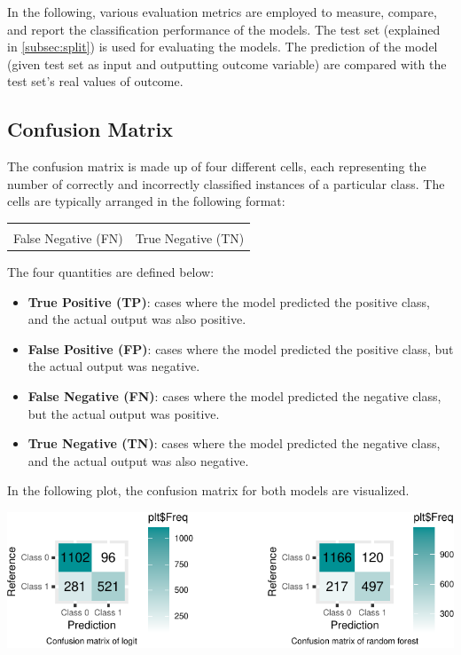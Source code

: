 \documentclass{article}
\providecommand{\tightlist}{%
  \setlength{\itemsep}{0pt}\setlength{\parskip}{0pt}}
\begin{document}
In the following, various evaluation metrics are employed to measure,
compare, and report the classification performance of the models. The
test set (explained in \ref{subsec:split}) is used for evaluating the
models. The prediction of the model (given test set as input and
outputting outcome variable) are compared with the test set's real
values of outcome.

\hypertarget{confusion-matrix}{%
\subsection{Confusion Matrix}\label{confusion-matrix}}

The confusion matrix is made up of four different cells, each
representing the number of correctly and incorrectly classified
instances of a particular class. The cells are typically arranged in the
following format:

\begin{table}[!h]
\centering
\begin{tabular}{ll}
\toprule
\cellcolor{gray!6}{True Positive (TP)} & \cellcolor{gray!6}{False Positive (FP)}\\
False Negative (FN) & True Negative (TN)\\
\bottomrule
\end{tabular}
\end{table}

The four quantities are defined below:

\begin{itemize}
\tightlist
\item
  \textbf{True Positive (TP)}: cases where the model predicted the
  positive class, and the actual output was also positive.
\item
  \textbf{False Positive (FP)}: cases where the model predicted the
  positive class, but the actual output was negative.
\item
  \textbf{False Negative (FN)}: cases where the model predicted the
  negative class, but the actual output was positive.
\item
  \textbf{True Negative (TN)}: cases where the model predicted the
  negative class, and the actual output was also negative.
\end{itemize}

In the following plot, the confusion matrix for both models are
visualized.

\begin{center}\includegraphics{report_files/figure-latex/unnamed-chunk-18-1} \end{center}
\end{document}
